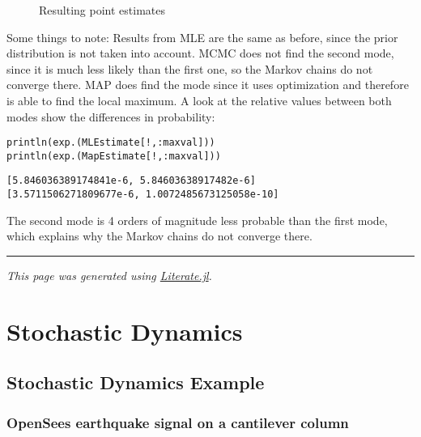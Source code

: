 \begin{figure}
\centering
\caption{Resulting point estimates}
\end{figure}
 Some things to note: Results from MLE are the same as before, since the prior distribution is not taken into account. MCMC does not find the second mode, since it is much less likely than the first one, so the Markov chains do not converge there. MAP does find the mode since it uses optimization and therefore is able to find the local maximum. A look at the relative values between both modes show the differences in probability:




\begin{verbatim}
println(exp.(MLEstimate[!,:maxval]))
println(exp.(MapEstimate[!,:maxval]))
\end{verbatim}


\begin{verbatim}
[5.846036389174841e-6, 5.84603638917482e-6]
[3.5711506271809677e-6, 1.0072485673125058e-10]
\end{verbatim}



The second mode is 4 orders of magnitude less probable than the first mode, which explains why the Markov chains do not converge there.



{\rule{\textwidth}{1pt}}


\emph{This page was generated using \href{https://github.com/fredrikekre/Literate.jl}{Literate.jl}.}



\chapter{Stochastic Dynamics}


\section{Stochastic Dynamics Example}



\label{6683717966732647304}{}


\subsection{OpenSees earthquake signal on a cantilever column}



